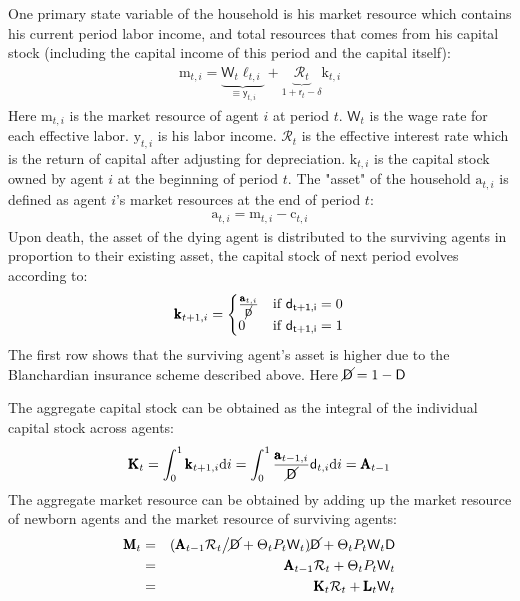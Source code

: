 \documentclass[12pt,letterpaper]{article}
\begin{document}
One primary state variable of the household is his market resource which contains his current period labor income, and total resources that comes from his capital stock (including the capital income of this period and the capital itself):
\begin{eqnarray}
\pmb{\mathrm{m}}_{t,i}=\underbrace{\mathsf{W}_{t}\pmb{\ell}_{t,i}}_{\equiv \pmb{\mathsf{y}}_{t,i}}+\underbrace{\mathcal{R}_{t}}_{1+\mathsf{r}_{t}-\delta}\pmb{\mathrm{k}}_{t,i}
\end{eqnarray}
Here $\pmb{\mathrm{m}}_{t,i}$ is the market resource of agent $i$ at period $t$. $\mathsf{W}_{t}$ is the wage rate for each effective labor. $\pmb{\mathrm{y}}_{t,i}$ is his labor income. $\mathcal{R}_{t}$ is the effective interest rate which is the return of capital after adjusting for depreciation. $\pmb{\mathrm{k}}_{t,i}$ is the capital stock owned by agent $i$ at the beginning of period $t$. The "asset" of the household $\pmb{\mathrm{a}}_{t,i}$ is defined as agent $i$'s market resources at the end of period $t$:
\begin{eqnarray}
\pmb{\mathrm{a}}_{t,i}=\pmb{\mathrm{m}}_{t,i}-\pmb{\mathrm{c}}_{t,i}
\end{eqnarray}
Upon death, the asset of the dying agent is distributed to the surviving agents in proportion to their existing asset, the capital stock of next period evolves according to:
\begin{eqnarray}
\pmb{\mathrm{k}}_{t+1,i}=
\begin{cases}
\frac{\pmb{\mathrm{a}}_{t,i}}{\cancel{\mathsf{D}}}  & \text{if }\mathsf{d_{t+1,i}}=0\\
0 & \text{if }\mathsf{d_{t+1,i}}=1
\end{cases}
\end{eqnarray}
The first row shows that the surviving agent's asset is higher due to the Blanchardian insurance scheme described above. Here $\cancel{\mathsf{D}}=1-\mathsf{D}$
\par
The aggregate capital stock can be obtained as the integral of the individual capital stock across agents:
\begin{eqnarray}
\pmb{\mathrm{K}}_{t}=\int_{0}^{1}\pmb{\mathrm{k}}_{t+1,i}\text{d}i=\int_{0}^{1}\frac{\pmb{\mathrm{a}}_{t-1,i}}{\cancel{\mathsf{D}}}\mathsf{d}_{t,i}\text{d}i=\pmb{\mathrm{A}}_{t-1}
\end{eqnarray} 
The aggregate market resource can be obtained by adding up the market resource of newborn agents and the market resource of surviving agents:
\begin{eqnarray}
\pmb{\mathrm{M}}_{t} & = & (\pmb{\mathrm{A}}_{t-1}\mathcal{R}_{t}\big/\cancel{\mathsf{D}}+\Theta_{t}P_{t}\mathsf{W}_{t})\cancel{\mathsf{D}}+\Theta_{t}P_{t}\mathsf{W}_{t}\mathsf{D}\\
& = & \pmb{\mathrm{A}}_{t-1}\mathcal{R}_{t}+\Theta_{t}P_{t}\mathsf{W}_{t} \nonumber\\
& = & \pmb{\mathrm{K}}_{t}\mathcal{R}_{t}+\pmb{\mathrm{L}}_{t}\mathsf{W}_{t} \nonumber
\end{eqnarray}
\end{document}
